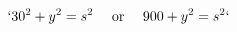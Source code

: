 \documentclass[preview]{standalone}
\begin{document}
\begin{align*}
`30^2 + y^2 = s^2 \quad \text{ or } \quad 900 + y^2 = s^2`
\end{align*}
\end{document}
